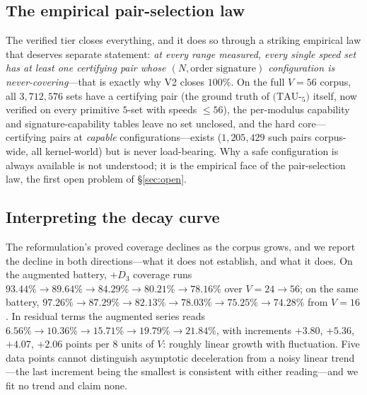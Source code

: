 \subsection{The empirical pair-selection law}

The verified tier closes everything, and it does so through a striking
empirical law that deserves separate statement: \emph{at every range
measured, every single speed set has at least one certifying pair whose
$(N,\text{order signature})$ configuration is never-covering}---that is
exactly why V2 closes $100\%$. On the full $V=56$ corpus, all
$3{,}712{,}576$ sets have a certifying pair (the ground truth of
$(\mathrm{TAU}$-$_5)$ itself, now verified on every primitive $5$-set
with speeds $\le56$), the per-modulus capability and
signature-capability tables leave no set unclosed, and the hard
core---certifying pairs at \emph{capable} configurations---exists
($1{,}205{,}429$ such pairs corpus-wide, all kernel-world) but is never
load-bearing. Why a safe configuration is always available is not
understood; it is the empirical face of the pair-selection law, the
first open problem of \S\ref{sec:open}.

\subsection{Interpreting the decay curve}

The reformulation's proved coverage declines as the corpus grows, and we
report the decline in both directions---what it does not
establish, and what it does. On the augmented battery, $+D_3$ coverage
runs $93.44\%\to89.64\%\to84.29\%\to80.21\%\to78.16\%$ over
$V=24\to56$; on the same battery,
$97.26\%\to87.29\%\to82.13\%\to78.03\%\to75.25\%\to74.28\%$ from
$V=16$. In residual terms the augmented series reads
$6.56\%\to10.36\%\to15.71\%\to19.79\%\to21.84\%$, with increments
$+3.80$, $+5.36$, $+4.07$, $+2.06$ points per $8$ units of $V$: roughly
linear growth with fluctuation. Five data points cannot distinguish
asymptotic deceleration from a noisy linear trend---the last increment
being the smallest is consistent with either reading---and we fit no
trend and claim none.

